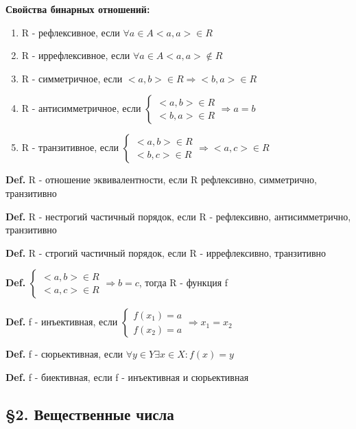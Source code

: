 \documentclass[14pt, letter paper]{article}
\begin{document}
\textbf{Свойства бинарных отношений: }
\begin{enumerate}
    \item R - рефлексивное, если $\forall a \in A <a, a> \in R$
    \item R - иррефлексивное, если $\forall a \in A <a, a> \notin R$
    \item R - симметричное, если $<a, b> \in R \Rightarrow <b, a> \in R$
    \item R - антисимметричное, если $\begin{cases} <a, b> \in R \\ <b, a> \in R \end{cases} \Rightarrow a = b$
    \item R - транзитивное, если $\begin{cases} <a, b> \in R \\ <b, c> \in R \end{cases} \Rightarrow <a, c> \in R$
\end{enumerate}

\textbf{Def.} R - отношение эквивалентности, если R рефлексивно, симметрично, транзитивно

\textbf{Def.} R - нестрогий частичный порядок, если R - рефлексивно, антисимметрично, транзитивно

\textbf{Def.} R - строгий частичный порядок, если R - иррефлексивно, транзитивно

\textbf{Def.} $\begin{cases} <a, b> \in R \\ <a, c> \in R \end{cases} \Rightarrow b = c$, тогда R - функция f

\textbf{Def.} f - инъективная, если $\begin{cases} f(x_1) = a \\ f(x_2) = a \end{cases} \Rightarrow x_1 = x_2$

\textbf{Def.} f - сюрьективная, если $\forall y \in Y \exists x \in X : f(x) = y$

\textbf{Def.} f - биективная, если f - инъективная и сюрьективная

\begin{center} \subsection*{\S 2. Вещественные числа} \end{center}
\end{document}
